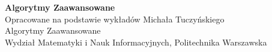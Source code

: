 \documentclass[11pt,a4paper]{article}
\theoremstyle{azdefinition}
\theoremstyle{azplain}
\theoremstyle{remark}
\theoremstyle{dygresjastyle}
\begin{document}

\begin{titlepage}
	\centering
	\vspace*{2cm}
	{\LARGE\bfseries\color{accent} Algorytmy Zaawansowane}\\[0.5cm]
	{\normalsize Opracowane na podstawie wykładów Michała Tuczyńskiego}\\[2cm]

	\vfill
	{\small Algorytmy Zaawansowane\\
		Wydział Matematyki i Nauk Informacyjnych, Politechnika Warszawska}
\end{titlepage}

\tableofcontents
\newpage













\end{document}
